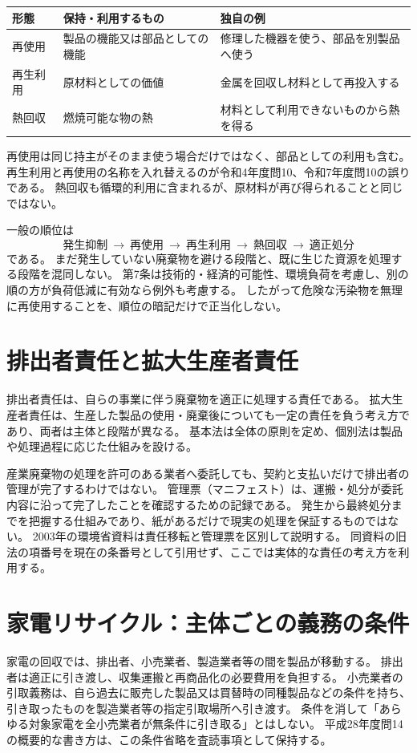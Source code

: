 \begin{center}
\begin{tabular}{p{.18\linewidth}p{.32\linewidth}p{.37\linewidth}}
\hline
形態 & 保持・利用するもの & 独自の例\\ \hline
再使用 & 製品の機能又は部品としての機能 & 修理した機器を使う、部品を別製品へ使う\\
再生利用 & 原材料としての価値 & 金属を回収し材料として再投入する\\
熱回収 & 燃焼可能な物の熱 & 材料として利用できないものから熱を得る\\ \hline
\end{tabular}
\end{center}
再使用は同じ持主がそのまま使う場合だけではなく、部品としての利用も含む。
再生利用と再使用の名称を入れ替えるのが令和4年度問10、令和7年度問10の誤りである。
熱回収も循環的利用に含まれるが、原材料が再び得られることと同じではない。

一般の順位は
\[
 \text{発生抑制}\ \longrightarrow\ \text{再使用}\ \longrightarrow\
 \text{再生利用}\ \longrightarrow\ \text{熱回収}\ \longrightarrow\ \text{適正処分}
\]
である\cite{env_circular_outline}。
まだ発生していない廃棄物を避ける段階と、既に生じた資源を処理する段階を混同しない。
第7条は技術的・経済的可能性、環境負荷を考慮し、別の順の方が負荷低減に有効なら例外も考慮する。
したがって危険な汚染物を無理に再使用することを、順位の暗記だけで正当化しない。

\section{排出者責任と拡大生産者責任}
\label{theory:environment:responsibility}
排出者責任は、自らの事業に伴う廃棄物を適正に処理する責任である。
拡大生産者責任は、生産した製品の使用・廃棄後についても一定の責任を負う考え方であり、両者は主体と段階が異なる。
基本法は全体の原則を定め、個別法は製品や処理過程に応じた仕組みを設ける。

産業廃棄物の処理を許可のある業者へ委託しても、契約と支払いだけで排出者の管理が完了するわけではない。
管理票（マニフェスト）は、運搬・処分が委託内容に沿って完了したことを確認するための記録である。
発生から最終処分までを把握する仕組みであり、紙があるだけで現実の処理を保証するものではない。
2003年の環境省資料は責任移転と管理票を区別して説明する\cite{env_waste2003}。
同資料の旧法の項番号を現在の条番号として引用せず、ここでは実体的な責任の考え方を利用する。

\section{家電リサイクル：主体ごとの義務の条件}
\label{theory:environment:appliance}
家電の回収では、排出者、小売業者、製造業者等の間を製品が移動する。
排出者は適正に引き渡し、収集運搬と再商品化の必要費用を負担する。
小売業者の引取義務は、自ら過去に販売した製品又は買替時の同種製品などの条件を持ち、
引き取ったものを製造業者等の指定引取場所へ引き渡す\cite{env_appliance}。
条件を消して「あらゆる対象家電を全小売業者が無条件に引き取る」とはしない。
平成28年度問14の概要的な書き方は、この条件省略を査読事項として保持する。

